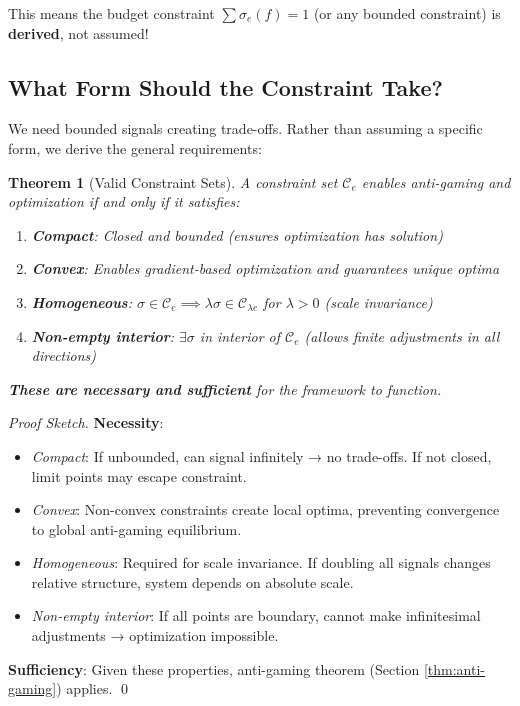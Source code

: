 \documentclass[11pt,a4paper]{article}
\newtheorem{theorem}{Theorem}[section]
\theoremstyle{definition}
\theoremstyle{remark}
\newcommand{\C}{\mathcal{C}}
\begin{document}
This means the budget constraint $\sum \sigma_e(f) = 1$ (or any bounded constraint) is \textbf{derived}, not assumed!

\subsection{What Form Should the Constraint Take?}

We need bounded signals creating trade-offs. Rather than assuming a specific form, we derive the general requirements:

\begin{theorem}[Valid Constraint Sets]
\label{thm:valid-constraints}
A constraint set $\C_e$ enables anti-gaming and optimization if and only if it satisfies:
\begin{enumerate}
\item \textbf{Compact}: Closed and bounded (ensures optimization has solution)
\item \textbf{Convex}: Enables gradient-based optimization and guarantees unique optima
\item \textbf{Homogeneous}: $\sigma \in \C_e \implies \lambda\sigma \in \C_{\lambda e}$ for $\lambda > 0$ (scale invariance)
\item \textbf{Non-empty interior}: $\exists \sigma$ in interior of $\C_e$ (allows finite adjustments in all directions)
\end{enumerate}

\textbf{These are necessary and sufficient} for the framework to function.
\end{theorem}

\begin{proof}[Proof Sketch]
\textbf{Necessity}:
\begin{itemize}
\item \textit{Compact}: If unbounded, can signal infinitely → no trade-offs. If not closed, limit points may escape constraint.
\item \textit{Convex}: Non-convex constraints create local optima, preventing convergence to global anti-gaming equilibrium.
\item \textit{Homogeneous}: Required for scale invariance. If doubling all signals changes relative structure, system depends on absolute scale.
\item \textit{Non-empty interior}: If all points are boundary, cannot make infinitesimal adjustments → optimization impossible.
\end{itemize}

\textbf{Sufficiency}: Given these properties, anti-gaming theorem (Section \ref{thm:anti-gaming}) applies. \qed
\end{proof}
\end{document}
